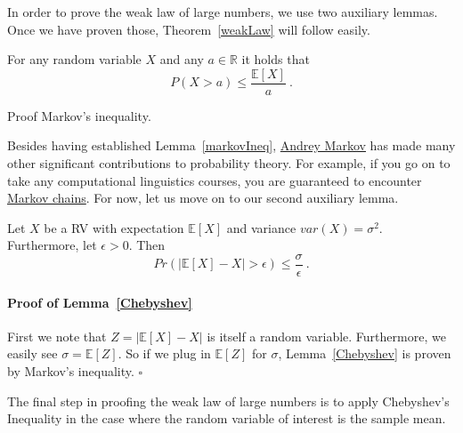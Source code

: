 In order to prove the weak law of large numbers, we use two auxiliary lemmas. Once we have proven those, Theorem~\ref{weakLaw} will follow easily. 

\begin{Lemma}\label{markovIneq}
For any random variable $ X $ and any $ a \in \mathbb{R} $ it holds that
$$ P(X > a) \leq \dfrac{\mathbb{E}[X]}{a} \ . $$
\end{Lemma}

\begin{Exercise}
Proof Markov's inequality.
\end{Exercise}

Besides having established Lemma~\ref{markovIneq}, \href{https://en.wikipedia.org/wiki/Andrey_Markov}{Andrey Markov} has made many other significant contributions to
probability theory. For example, if you go on to take any computational linguistics courses, you are guaranteed to encounter 
\href{https://en.wikipedia.org/wiki/Markov_chain}{Markov chains}. For now, let us move on to our second auxiliary lemma.

\begin{Lemma}\label{Chebyshev}
Let $ X $ be a RV with expectation $ \mathbb{E}[X] $ and variance $ var(X) = \sigma^{2} $. Furthermore, let $ \epsilon > 0 $. Then
$$ Pr(|\mathbb{E}[X] - X| > \epsilon) \leq \dfrac{\sigma}{\epsilon} \ . $$ 
\end{Lemma}

\paragraph{Proof of Lemma~\ref{Chebyshev}} 
First we note that $ Z = |\mathbb{E}[X] - X | $ is itself a random variable. Furthermore, we easily see $ \sigma = \mathbb{E}[Z] $.
So if we plug in $ \mathbb{E}[Z] $ for $ \sigma $, Lemma~\ref{Chebyshev} is proven by Markov's inequality. $ \square $ \bigskip

The final step in proofing the weak law of large numbers is to apply Chebyshev's Inequality in the case where the random variable of interest is
the sample mean.

